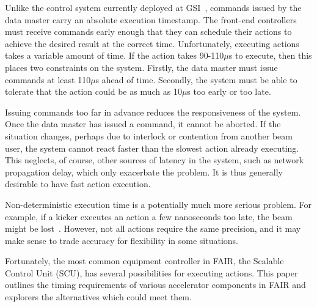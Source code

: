 \documentclass{JAC2003}
\begin{document}
Unlike the control system currently deployed at GSI~\cite{old-gsi},
commands issued by the data master carry an absolute execution timestamp.
The front-end controllers must receive commands early enough 
that they can schedule their actions 
to achieve the desired result at the correct time.
Unfortunately, executing actions takes a variable amount of time.
If the action takes 90-110$\mu$s to execute, 
then this places two constraints on the system.
Firstly, the data master must issue commands at least 110$\mu$s ahead of time.
Secondly, the system must be able to tolerate that the action could be as
much as 10$\mu$s too early or too late.

Issuing commands too far in advance reduces the responsiveness of the system.
Once the data master has issued a command, it cannot be aborted.
If the situation changes,
perhaps due to interlock or contention from another beam user,
the system cannot react faster than the slowest action already executing.
This neglects, of course, other sources of latency in the system,
such as network propagation delay, which only exacerbate the problem.
It is thus generally desirable to have fast action execution.

Non-deterministic execution time is a potentially much more serious problem.
For example, if a kicker executes an action a few nanoseconds too late,
the beam might be lost~\cite{kicker}.
However, not all actions require the same precision,
and it may make sense to trade accuracy for flexibility in some situations.

Fortunately, the  most common equipment controller in FAIR, 
the Scalable Control Unit (SCU),
has several possibilities for executing actions.
This paper outlines the timing requirements of various accelerator
components in FAIR and explorers the alternatives which could meet them.
\end{document}

